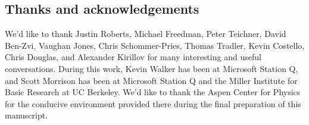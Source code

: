 \subsection{Thanks and acknowledgements}
We'd like to thank 
Justin Roberts, 
Michael Freedman, 
Peter Teichner, 
David Ben-Zvi, 
Vaughan Jones, 
Chris Schommer-Pries, 
Thomas Tradler,
Kevin Costello, 
Chris Douglas,
and
Alexander Kirillov
for many interesting and useful conversations. 
During this work, Kevin Walker has been at Microsoft Station Q, and Scott Morrison has been at Microsoft Station Q and the Miller Institute for Basic Research at UC Berkeley. We'd like to thank the Aspen Center for Physics for the conducive environment provided there during the final preparation of this manuscript.

